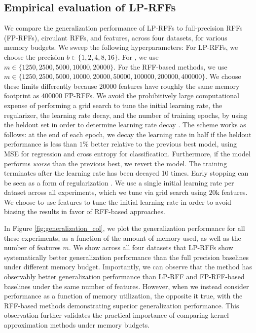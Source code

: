 \subsection{Empirical evaluation of LP-RFFs}
We compare the generalization performance of LP-RFFs to full-precision RFFs (FP-RFFs), circulant RFFs, and \Nystrom features, across four datasets, for various memory budgets.  We sweep the following hyperparameters: For LP-RFFs, we choose the precision $b \in \{1,2,4,8,16\}$. For \Nystrom, we use $m \in \{1250, 2500, 5000, 10000, 20000\}$.  For the RFF-based methods, we use $m\in \{1250, 2500, 5000, 10000, 20000, 50000, 100000, 200000, 400000\}$.  We choose these limits differently because $\num[group-separator={,}]{20000}$ \Nystrom features have roughly the same memory footprint as $\num[group-separator={,}]{400000}$ FP-RFFs. We avoid the prohibitively large computational expense of performing a grid search to tune the initial learning rate, the regularizer, the learning rate decay, and the number of training epochs, by using the heldout set in order to determine learning rate decay \citep{morgan1990generalization,sainath2013b,sainath2013low}. The scheme works as follows: at the end of each epoch, we decay the learning rate in half if the heldout performance is less than $1\%$ better relative to the previous best model, using MSE for regression and cross entropy for classification. Furthermore, if the model performs \textit{worse} than the previous best, we revert the model. The training terminates after the learning rate has been decayed 10 times. Early stopping can be seen as a form of regularization \citep{zhang2005boosting,wei2017early}.  We use a single initial learning rate per dataset across all experiments, which we tune via grid search using $20\text{k}$ \Nystrom features. We choose to use \Nystrom features to tune the initial learning rate in order to avoid biasing the results in favor of RFF-based approaches. 

In Figure \ref{fig:generalization_col}, we plot the generalization performance for all these experiments, as a function of the amount of memory used, as well as the number of features $m$. We show across all four datasets that LP-RFFs show systematically better generalization performance than the full precision baselines under different memory budget. Importantly, we can observe that the \Nystrom method has observably better generalization performance than LP-RFF and FP-RFF-based baselines under the same number of features. However, when we instead consider performance as a function of memory utilization, the opposite it true, with the RFF-based methods demonstrating superior generalization performance. This observation further validates the practical importance of comparing kernel approximation methods under memory budgets.

